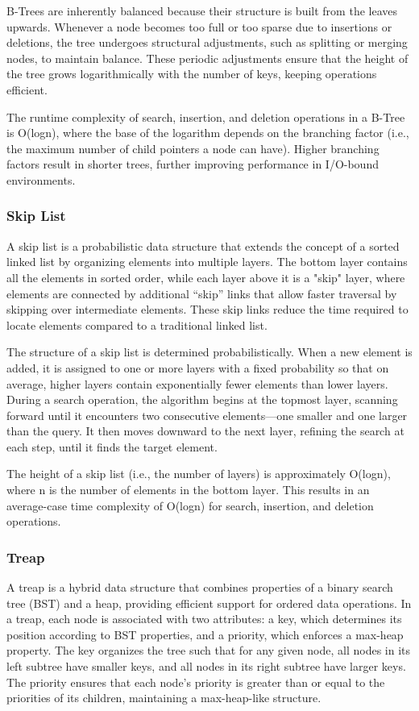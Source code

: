 \documentclass[sigconf]{acmart}
\begin{document}
B-Trees are inherently balanced because their structure is built from the leaves upwards. Whenever a node becomes too full or too sparse due to insertions or deletions, the tree undergoes structural adjustments, such as splitting or merging nodes, to maintain balance. These periodic adjustments ensure that the height of the tree grows logarithmically with the number of keys, keeping operations efficient.

The runtime complexity of search, insertion, and deletion operations in a B-Tree is O(logn), where the base of the logarithm depends on the branching factor (i.e., the maximum number of child pointers a node can have). Higher branching factors result in shorter trees, further improving performance in I/O-bound environments.

\subsubsection{Skip List}
A skip list is a probabilistic data structure that extends the concept of a sorted linked list by organizing elements into multiple layers. The bottom layer contains all the elements in sorted order, while each layer above it is a "skip" layer, where elements are connected by additional “skip” links that allow faster traversal by skipping over intermediate elements. These skip links reduce the time required to locate elements compared to a traditional linked list.

The structure of a skip list is determined probabilistically. When a new element is added, it is assigned to one or more layers with a fixed probability so that on average, higher layers contain exponentially fewer elements than lower layers. During a search operation, the algorithm begins at the topmost layer, scanning forward until it encounters two consecutive elements—one smaller and one larger than the query. It then moves downward to the next layer, refining the search at each step, until it finds the target element.

The height of a skip list (i.e., the number of layers) is approximately O(logn), where n is the number of elements in the bottom layer. This results in an average-case time complexity of O(logn) for search, insertion, and deletion operations.
\subsubsection{Treap}
A treap is a hybrid data structure that combines properties of a binary search tree (BST) and a heap, providing efficient support for ordered data operations. In a treap, each node is associated with two attributes: a key, which determines its position according to BST properties, and a priority, which enforces a max-heap property. The key organizes the tree such that for any given node, all nodes in its left subtree have smaller keys, and all nodes in its right subtree have larger keys. The priority ensures that each node's priority is greater than or equal to the priorities of its children, maintaining a max-heap-like structure.
\end{document}
